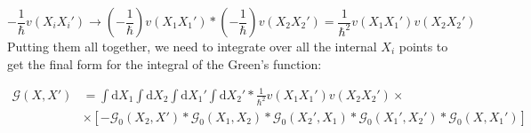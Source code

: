\begin{equation}
- \frac{1}{\hbar} v \left( X_{i} X_{i}' \right)
\to
\left( - \frac{1}{\hbar} \right) v \left( X_{1} X_{1}' \right)
*
\left( - \frac{1}{\hbar} \right) v \left( X_{2} X_{2}' \right)
=
\frac{1}{\hbar^{2}} v \left( X_{1} X_{1}' \right) v \left( X_{2} X_{2}' \right)
\end{equation}
Putting them all together, we need to integrate over all the internal $X_{i}$ points to get the final form for the integral of the Green's function:

\begin{align}
\mathcal{G} \left( X, X' \right)
&=
\int \text{d}X_{1} \int \text{d}X_{2} \int \text{d}X_{1}' \int \text{d}X_{2}'
*
\frac{1}{\hbar^{2}} v \left( X_{1} X_{1}' \right) v \left( X_{2} X_{2}' \right)
\times \nonumber \\
&\times
\left[
- \mathcal{G}_{0} \left( X_{2}, X' \right)
*
\mathcal{G}_{0} \left( X_{1}, X_{2} \right)
*
\mathcal{G}_{0} \left( X_{2}', X_{1} \right)
*
\mathcal{G}_{0} \left( X_{1}', X_{2}' \right)
*
\mathcal{G}_{0} \left( X, X_{1}' \right)
\right]
\end{align}